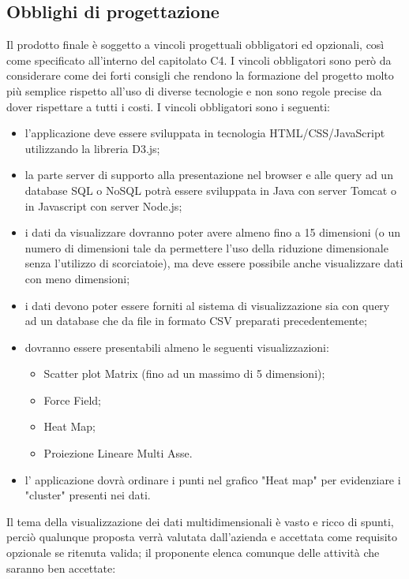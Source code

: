 \subsection{Obblighi di progettazione}
Il prodotto finale è soggetto a vincoli progettuali obbligatori ed opzionali, così come specificato all’interno del capitolato C4. I vincoli obbligatori sono però da considerare come dei forti consigli che rendono la formazione del progetto molto più semplice rispetto all'uso di diverse tecnologie e non sono regole precise da dover rispettare a tutti i costi.
I vincoli obbligatori sono i seguenti:
\begin{itemize}
	\item l'applicazione deve essere sviluppata in tecnologia HTML/CSS/JavaScript utilizzando la libreria D3.js;
	\item la parte server di supporto alla presentazione nel browser e alle query ad un database SQL o NoSQL
potrà essere sviluppata in Java con server Tomcat o in Javascript con server Node.js;
	\item i dati da visualizzare dovranno poter avere almeno fino a 15 dimensioni (o un numero di dimensioni tale da permettere l'uso della riduzione dimensionale senza l'utilizzo di scorciatoie), ma deve essere possibile anche visualizzare dati con meno dimensioni;
	\item i dati devono poter essere forniti al sistema di visualizzazione sia con query ad un database che da file in formato CSV preparati precedentemente;
	\item dovranno essere presentabili almeno le seguenti visualizzazioni:
	\begin{itemize}
		\item Scatter plot Matrix (fino ad un massimo di 5 dimensioni);
		\item Force Field;
		\item Heat Map;
		\item Proiezione Lineare Multi Asse.
	\end{itemize}
	\item l' applicazione dovrà ordinare i punti nel grafico "Heat map" per evidenziare i "cluster" presenti nei dati.
\end{itemize}
Il tema della visualizzazione dei dati multidimensionali è vasto e ricco di spunti, perciò qualunque proposta verrà valutata dall'azienda e accettata come requisito opzionale se ritenuta valida; il proponente elenca comunque delle attività che saranno ben accettate:
